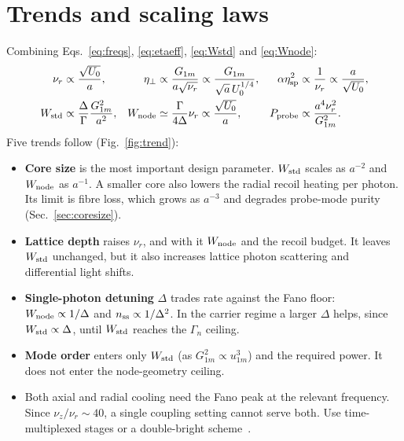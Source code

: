 \documentclass[11pt,a4paper]{article}
\newcommand{\etaeff}{\eta_{\perp}}
\begin{document}
\section{Trends and scaling laws}
\label{sec:trends}
Combining Eqs.~\eqref{eq:freqs}, \eqref{eq:etaeff}, \eqref{eq:Wstd} and \eqref{eq:Wnode}:
\begin{align}
  \nu_r&\propto\frac{\sqrt{U_0}}{a}, &
  \etaeff&\propto\frac{G_{1m}}{a\sqrt{\nu_r}}\propto\frac{G_{1m}}{\sqrt a\,U_0^{1/4}}, &
  \alpha\eta_{\rm sp}^2&\propto\frac1{\nu_r}\propto\frac{a}{\sqrt{U_0}},\nonumber\\
  W_{\rm std}&\propto\frac{\Delta}{\Gamma}\frac{G_{1m}^2}{a^2}, &
  W_{\rm node}&\simeq\frac{\Gamma}{4\Delta}\nu_r\propto\frac{\sqrt{U_0}}{a}, &
  P_{\rm probe}&\propto\frac{a^4\nu_r^2}{G_{1m}^2}.
  \label{eq:scaling}
\end{align}
Five trends follow (Fig.~\ref{fig:trend}):
\begin{itemize}
\item \textbf{Core size} is the most important design parameter. $W_{\rm std}$ scales as $a^{-2}$ and $W_{\rm node}$ as $a^{-1}$. A smaller core also lowers the radial recoil heating per photon. Its limit is fibre loss, which grows as $a^{-3}$ and degrades probe-mode purity (Sec.~\ref{sec:coresize}).
\item \textbf{Lattice depth} raises $\nu_r$, and with it $W_{\rm node}$ and the recoil budget. It leaves $W_{\rm std}$ unchanged, but it also increases lattice photon scattering and differential light shifts.
\item \textbf{Single-photon detuning} $\Delta$ trades rate against the Fano floor: $W_{\rm node}\propto1/\Delta$ and $n_{\rm ss}\propto1/\Delta^2$. In the carrier regime a larger $\Delta$ helps, since $W_{\rm std}\propto\Delta$, until $W_{\rm std}$ reaches the $\Gamma_n$ ceiling.
\item \textbf{Mode order} enters only $W_{\rm std}$ (as $G_{1m}^2\propto u_{1m}^3$) and the required power. It does not enter the node-geometry ceiling.
\item Both axial and radial cooling need the Fano peak at the relevant frequency. Since $\nu_z/\nu_r\sim40$, a single coupling setting cannot serve both. Use time-multiplexed stages or a double-bright scheme~\cite{scharnhorst2018}.
\end{itemize}
\end{document}
